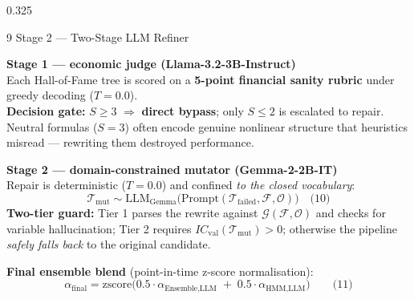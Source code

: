 \documentclass[final]{beamer}
\newcommand{\hl}[1]{\textbf{\color{navy2}#1}}
\newcommand{\gd}[1]{\textbf{\color{good}#1}}
\begin{document}
\begin{frame}[t]{}
\begin{columns}[t]
\begin{column}{0.325\textwidth}
\begin{block}{9 \; Stage 2 --- Two-Stage LLM Refiner}
\noindent\begin{minipage}[t]{0.475\linewidth}
\textbf{\color{accent2}Stage 1 --- economic judge (Llama-3.2-3B-Instruct)}\\[0.12cm]
Each Hall-of-Fame tree is scored on a \hl{5-point financial sanity rubric} under greedy decoding ($T = 0.0$).\\[0.1cm]
\textbf{Decision gate:} $S \geq 3$ $\Rightarrow$ \gd{direct bypass}; only $S \leq 2$ is escalated to repair. Neutral formulas ($S{=}3$) often encode genuine nonlinear structure that heuristics misread --- rewriting them destroyed performance.
\end{minipage}\hfill
\begin{minipage}[t]{0.495\linewidth}
\textbf{\color{accent2}Stage 2 --- domain-constrained mutator (Gemma-2-2B-IT)}\\[0.12cm]
Repair is deterministic ($T = 0.0$) and confined \emph{to the closed vocabulary}:
{\footnotesize\[\mathcal{T}_{\text{mut}} \sim \mathrm{LLM}_{\text{Gemma}}\bigl(\mathrm{Prompt}(\mathcal{T}_{\text{failed}},\mathcal{F},\mathcal{O})\bigr) \quad \text{(10)}\]}
\textbf{Two-tier guard:} Tier 1 parses the rewrite against $\mathcal{G}(\mathcal{F},\mathcal{O})$ and checks for variable hallucination; Tier 2 requires $IC_{\text{val}}(\mathcal{T}_{\text{mut}}) > 0$; otherwise the pipeline \emph{safely falls back} to the original candidate.
\end{minipage}
\vskip0.18cm
\textbf{Final ensemble blend} (point-in-time z-score normalisation):
\[ \alpha_{\text{final}} = \mathrm{zscore}\bigl(0.5\cdot\alpha_{\text{Ensemble,LLM}} \;+\; 0.5\cdot\alpha_{\text{HMM,LLM}}\bigr) \qquad \text{(11)} \]
\end{block}


\end{column}
\end{columns}
\end{frame}
\end{document}
